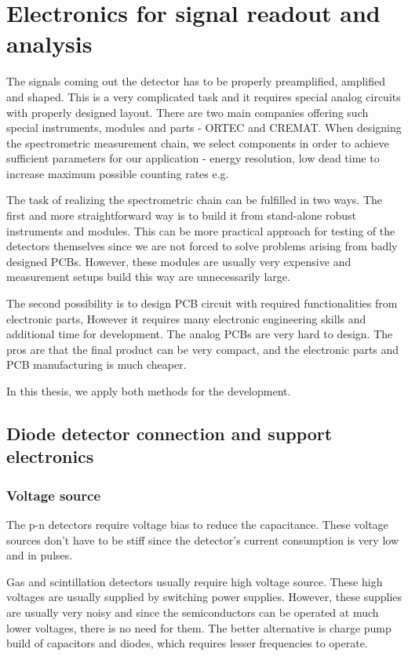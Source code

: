 
\chapter{Electronics for signal readout and analysis}
The signals coming out the detector has to be properly preamplified, amplified and shaped. This is a very complicated task and it requires special analog circuits with properly designed layout. 
There are two main companies offering such special instruments, modules and parts - ORTEC and CREMAT. When designing the spectrometric measurement chain, we select components in order to achieve sufficient parameters for our application - energy resolution, low dead time to increase maximum possible counting rates e.g. 
\par
The task of realizing the spectrometric chain can be fulfilled in two ways. The first and more straightforward way is to build it from stand-alone robust instruments and modules. This can be more practical approach for testing of the detectors themselves since we are not forced to solve problems arising from badly designed PCBs. However, these modules are usually very expensive and measurement setups build this way are unnecessarily large.
\par
The second possibility is to design PCB circuit with required functionalities from electronic parts, However it requires many electronic engineering skills and additional time for development. The analog PCBs are very hard to design. The pros are that the final product can be very compact, and the electronic parts and PCB manufacturing is much cheaper. 
\par
In this thesis, we apply both methods for the development.



\section{Diode detector connection and support electronics}
\subsection{Voltage source}
The p-n detectors require voltage bias to reduce the capacitance.
These voltage sources don't have to be stiff since the detector's current consumption is very low and in pulses.
\par
Gas and scintillation detectors usually require high voltage source. These high voltages are usually supplied by switching power supplies.
However, these supplies are usually very noisy and since the semiconductors can be operated at much lower voltages, there is no need for them. The better alternative is charge pump build of capacitors and diodes, which requires lesser frequencies to operate.
